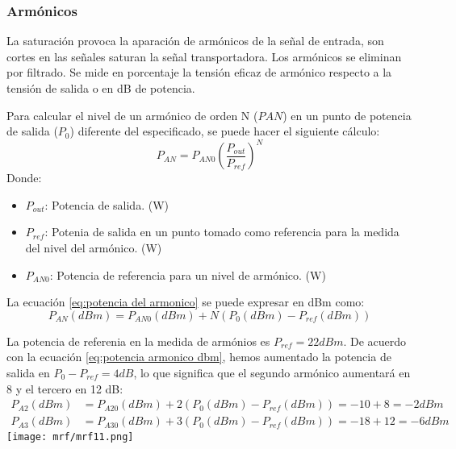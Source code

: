 \documentclass[
	12pt, %
	fleqn, %
	a4paper, %
	oneside, %
]{LegrandOrangeBook}
\begin{document}
\subsubsection{Armónicos}
La saturación provoca la aparación de armónicos de la señal de entrada, son cortes en las señales saturan la señal transportadora. Los armónicos se eliminan por filtrado. Se mide en porcentaje la tensión eficaz de armónico respecto a la tensión de salida o en dB de potencia.
\begin{definition}
Para calcular el nivel de un armónico de orden N ($P{AN}$) en un punto de potencia de salida ($P_0$) diferente del especificado, se puede hacer el siguiente cálculo:
\begin{equation}
P_{AN}=P_{AN0}\left(\frac{P_{out}}{P_{ref}}\right)^N
\label{eq:potencia del armonico}
\end{equation}
Donde:
\begin{itemize}
\item $P_{out}$: Potencia de salida. (W)
\item $P_{ref}$: Potenia de salida en un punto tomado como referencia para la medida del nivel del armónico. (W)
\item $P_{AN0}$: Potencia de referencia para un nivel de armónico. (W)
\end{itemize}
La ecuación \ref{eq:potencia del armonico} se puede expresar en dBm como:
\begin{equation}
P_{AN}(dBm)=P_{AN0}(dBm)+N(P_0(dBm)-P_{ref}(dBm))
\label{eq:potencia armonico dbm}
\end{equation}
\end{definition}
\begin{example}
La potencia de referenia en la medida de armónios es $P_{ref}=22 dBm$. De acuerdo con la ecuación \ref{eq:potencia armonico dbm}, hemos aumentado la potencia de salida en $P_0-P_{ref}=4dB$, lo que significa que el segundo armónico aumentará en 8 y el tercero en 12 dB:
\begin{align*}
P_{A2}(dBm)&=P_{A20}(dBm)+2(P_0(dBm)-P_{ref}(dBm))=-10+8=-2dBm\\
P_{A3}(dBm)&=P_{A30}(dBm)+3(P_0(dBm)-P_{ref}(dBm))=-18+12=-6dBm
\end{align*}
\texttt{[image: mrf/mrf11.png]}
\end{example}
\end{document}
